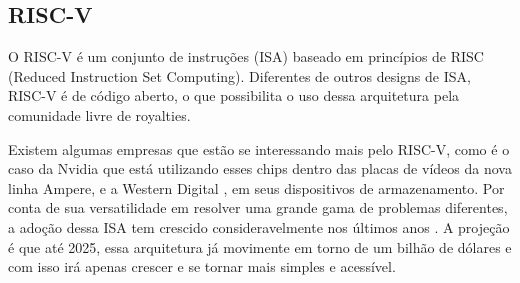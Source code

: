 \subsection{RISC-V}

O RISC-V é um conjunto de instruções (ISA) baseado em princípios de RISC (Reduced Instruction Set Computing). 
Diferentes de outros designs de ISA, RISC-V é de código aberto, o que possibilita o uso dessa arquitetura pela 
comunidade livre de royalties.

Existem algumas empresas que estão se interessando mais pelo RISC-V, como é o caso da Nvidia \cite{Nvidia_Riscv} que 
está utilizando esses chips dentro das placas de vídeos da nova linha Ampere, e a Western Digital \cite{WesternDigital_Riscv}, 
em seus dispositivos de armazenamento. Por conta de sua versatilidade em resolver uma grande gama de problemas diferentes, 
a adoção dessa ISA tem crescido consideravelmente nos últimos anos \cite{RISCV_growth}. A projeção é que até 2025, essa 
arquitetura já movimente em torno de um bilhão de dólares \cite{RISCV_market_growth} e com isso irá apenas crescer e se 
tornar mais simples e acessível.
